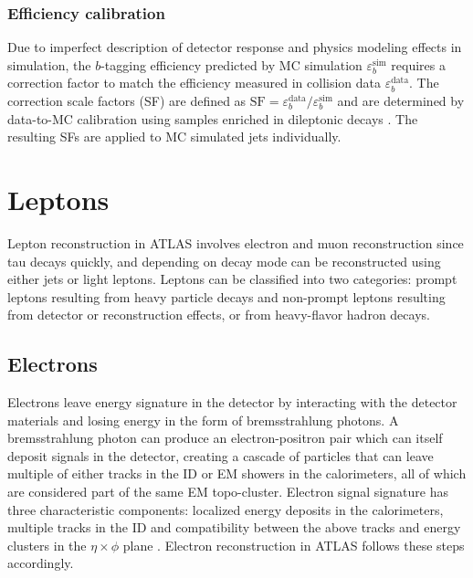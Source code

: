 \documentclass[../thesis.tex]{subfiles}
\begin{document}
\subsubsection*{Efficiency calibration}
Due to imperfect description of detector response and physics modeling effects in simulation, the $b$-tagging efficiency predicted by \acs{MC} simulation $\varepsilon_b^\mathrm{sim}$ requires a correction factor to match the efficiency measured in collision data $\varepsilon_b^\mathrm{data}$. The correction scale factors (\acs{SF}) are defined as $\mathrm{SF}=\varepsilon_b^\mathrm{data}/\varepsilon_b^\mathrm{sim}$ and are determined by data-to-\acs{MC} calibration using samples enriched in dileptonic \ttbar decays \citep{ftag:calib}. The resulting \acs{SF}s are applied to \acs{MC} simulated jets individually.


\section{Leptons}
Lepton reconstruction in ATLAS involves electron and muon reconstruction since tau decays quickly, and depending on decay mode can be reconstructed using either jets or light leptons.  Leptons can be classified into two categories: prompt leptons resulting from heavy particle decays and non-prompt leptons resulting from detector or reconstruction effects, or from heavy-flavor hadron decays.

\subsection{Electrons}
\label{sec:electron}
Electrons leave energy signature in the detector by interacting with the detector materials and losing energy in the form of bremsstrahlung photons. A bremsstrahlung photon can produce an electron-positron pair which can itself deposit signals in the detector, creating a cascade of particles that can leave multiple of either tracks in the \acs{ID} or \acs{EM} showers in the calorimeters, all of which are considered part of the same \acs{EM} topo-cluster. Electron signal signature has three characteristic components: localized energy deposits in the calorimeters, multiple tracks in the \acs{ID} and compatibility between the above tracks and energy clusters in the $\eta \times \phi$ plane \citep{reco:electron_id}. Electron reconstruction in ATLAS follows these steps accordingly.
\end{document}
